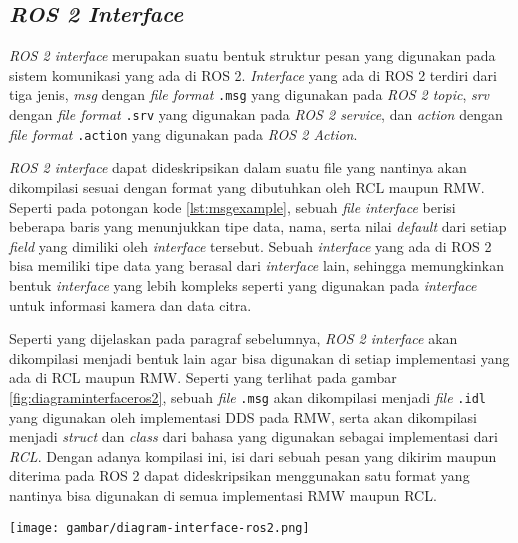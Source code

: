 \subsection{\emph{ROS 2 Interface}}
\label{subsec:ros2interface}

\emph{ROS 2 interface} merupakan suatu bentuk struktur pesan yang digunakan pada sistem komunikasi yang ada di ROS 2.
\emph{Interface} yang ada di ROS 2 terdiri dari tiga jenis,
  \emph{msg} dengan \emph{file format} \lstinline{.msg} yang digunakan pada \emph{ROS 2 topic},
  \emph{srv} dengan \emph{file format} \lstinline{.srv} yang digunakan pada \emph{ROS 2 service},
  dan \emph{action} dengan \emph{file format} \lstinline{.action} yang digunakan pada \emph{ROS 2 Action}.

\emph{ROS 2 interface} dapat dideskripsikan dalam suatu file yang nantinya akan dikompilasi sesuai dengan format yang dibutuhkan oleh RCL maupun RMW.
Seperti pada potongan kode \ref{lst:msgexample},
  sebuah \emph{file interface} berisi beberapa baris yang menunjukkan tipe data, nama, serta nilai \emph{default} dari setiap \emph{field} yang dimiliki oleh \emph{interface} tersebut.
Sebuah \emph{interface} yang ada di ROS 2 bisa memiliki tipe data yang berasal dari \emph{interface} lain,
  sehingga memungkinkan bentuk \emph{interface} yang lebih kompleks seperti yang digunakan pada \emph{interface} untuk informasi kamera dan data citra.



Seperti yang dijelaskan pada paragraf sebelumnya,
  \emph{ROS 2 interface} akan dikompilasi menjadi bentuk lain agar bisa digunakan di setiap implementasi yang ada di RCL maupun RMW.
Seperti yang terlihat pada gambar \ref{fig:diagraminterfaceros2},
  sebuah \emph{file} \lstinline{.msg} akan dikompilasi menjadi \emph{file} \lstinline{.idl} yang digunakan oleh implementasi DDS pada RMW,
  serta akan dikompilasi menjadi \emph{struct} dan \emph{class} dari bahasa yang digunakan sebagai implementasi dari \emph{RCL}.
Dengan adanya kompilasi ini,
  isi dari sebuah pesan yang dikirim maupun diterima pada ROS 2 dapat dideskripsikan menggunakan satu format yang nantinya bisa digunakan di semua implementasi RMW maupun RCL.

\begin{sidewaysfigure}
  \centering
  \texttt{[image: gambar/diagram-interface-ros2.png]}
  \caption{Diagram abstraksi interface yang ada pada ROS 2 \citep{url:ros2interfacesconcept}.}
  \label{fig:diagraminterfaceros2}
\end{sidewaysfigure}
